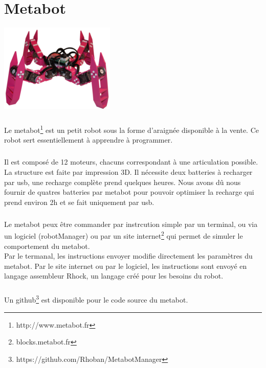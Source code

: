 \documentclass[10pt,a4paper]{report}
\begin{document}
\chapter{Metabot}
\begin{center}
\includegraphics[scale=0.5]{image/metabot.jpg}
\end{center}

\paragraph{}
Le metabot\footnote{http://www.metabot.fr} est un petit robot sous la forme d'araignée disponible à la vente. Ce robot sert essentiellement à apprendre à programmer.
\paragraph{}
Il est composé de 12 moteurs, chacuns correspondant à une articulation possible. La structure est faite par impression 3D. 
Il nécessite deux batteries à recharger par usb, une recharge complète prend quelques heures. Nous avons dû nous fournir de quatres batteries par metabot pour pouvoir optimiser la recharge qui prend environ 2h et se fait uniquement par usb.
\paragraph{}
Le metabot peux être commander par instrcution simple par un terminal, ou via un logiciel (robotManager) ou par un site internet\footnote{blocks.metabot.fr} qui permet de simuler le comportement du metabot.
\\
Par le termanal, les instructions envoyer modifie directement les paramètres du metabot. Par le site internet ou par le logiciel, les instructions sont envoyé en langage assembleur Rhock, un langage créé pour les besoins du robot.
\paragraph{}
Un github\footnote{https://github.com/Rhoban/MetabotManager} est disponible pour le code source du metabot.
\end{document}
